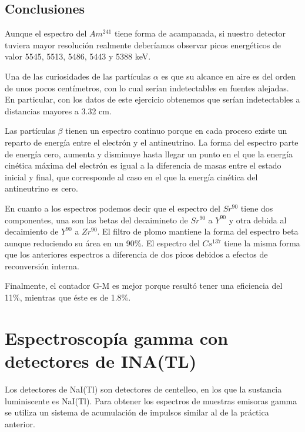 \documentclass[11pt]{article}
\begin{document}
    \hypertarget{conclusiones}{%
\subsection{Conclusiones}\label{conclusiones}}

Aunque el espectro del \(Am^{241}\) tiene forma de acampanada, si
nuestro detector tuviera mayor resolución realmente deberíamos observar
picos energéticos de valor 5545, 5513, 5486, 5443 y 5388 keV.

Una de las curiosidades de las partículas \(\alpha\) es que su alcance
en aire es del orden de unos pocos centímetros, con lo cual serían
indetectables en fuentes alejadas. En particular, con los datos de este
ejercicio obtenemos que serían indetectables a distancias mayores a 3.32
cm.

Las partículas \(\beta\) tienen un espectro continuo porque en cada
proceso existe un reparto de energía entre el electrón y el
antineutrino. La forma del espectro parte de energía cero, aumenta y
disminuye hasta llegar un punto en el que la energía cinética máxima del
electrón es igual a la diferencia de masas entre el estado inicial y
final, que corresponde al caso en el que la energía cinética del
antineutrino es cero.

En cuanto a los espectros podemos decir que el espectro del \(Sr^{90}\)
tiene dos componentes, una son las betas del decaimineto de \(Sr^{90}\)
a \(Y^{90}\) y otra debida al decaimiento de \(Y^{90}\) a \(Zr^{90}\).
El filtro de plomo mantiene la forma del espectro beta aunque reduciendo
su área en un 90\%. El espectro del \(Cs^{137}\) tiene la misma forma
que los anteriores espectros a diferencia de dos picos debidos a efectos
de reconversión interna.

Finalmente, el contador G-M es mejor porque resultó tener una eficiencia
del 11\%, mientras que éste es de 1.8\%.

    \hypertarget{espectroscopuxeda-gamma-con-detectores-de-inatl}{%
\section{Espectroscopía gamma con detectores de
INA(TL)}\label{espectroscopuxeda-gamma-con-detectores-de-inatl}}

Los detectores de NaI(Tl) son detectores de centelleo, en los que la
sustancia luminiscente es NaI(Tl). Para obtener los espectros de
muestras emisoras gamma se utiliza un sistema de acumulación de impulsos
similar al de la práctica anterior.
\end{document}
